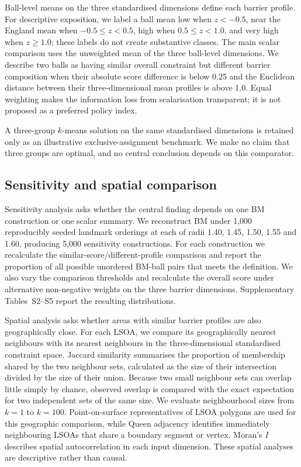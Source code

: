 \documentclass[11pt,a4paper]{article}
\begin{document}
Ball-level means on the three standardised dimensions define each barrier profile. For descriptive exposition, we label a ball mean low when $z<-0.5$, near the England mean when $-0.5\leq z<0.5$, high when $0.5\leq z<1.0$, and very high when $z\geq1.0$; these labels do not create substantive classes. The main scalar comparison uses the unweighted mean of the three ball-level dimensions. We describe two balls as having similar overall constraint but different barrier composition when their absolute score difference is below 0.25 and the Euclidean distance between their three-dimensional mean profiles is above 1.0. Equal weighting makes the information loss from scalarisation transparent; it is not proposed as a preferred policy index.

A three-group $k$-means solution on the same standardised dimensions is retained only as an illustrative exclusive-assignment benchmark. We make no claim that three groups are optimal, and no central conclusion depends on this comparator.

\subsection{Sensitivity and spatial comparison}
Sensitivity analysis asks whether the central finding depends on one BM construction or one scalar summary. We reconstruct BM under 1,000 reproducibly seeded landmark orderings at each of radii 1.40, 1.45, 1.50, 1.55 and 1.60, producing 5,000 sensitivity constructions. For each construction we recalculate the similar-score/different-profile comparison and report the proportion of all possible unordered BM-ball pairs that meets the definition. We also vary the comparison thresholds and recalculate the overall score under alternative non-negative weights on the three barrier dimensions. Supplementary Tables~S2--S5 report the resulting distributions.

Spatial analysis asks whether areas with similar barrier profiles are also geographically close. For each LSOA, we compare its geographically nearest neighbours with its nearest neighbours in the three-dimensional standardised constraint space. Jaccard similarity summarises the proportion of membership shared by the two neighbour sets, calculated as the size of their intersection divided by the size of their union. Because two small neighbour sets can overlap little simply by chance, observed overlap is compared with the exact expectation for two independent sets of the same size. We evaluate neighbourhood sizes from $k=1$ to $k=100$. Point-on-surface representatives of LSOA polygons are used for this geographic comparison, while Queen adjacency identifies immediately neighbouring LSOAs that share a boundary segment or vertex. Moran's $I$ describes spatial autocorrelation in each input dimension. These spatial analyses are descriptive rather than causal.
\end{document}
